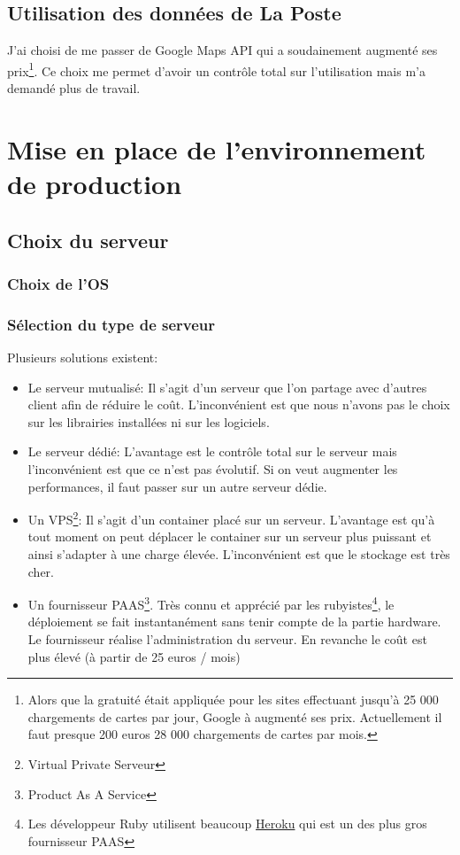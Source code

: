 \documentclass[]{report}
\begin{document}
  \section{Utilisation des données de La Poste}

    J'ai choisi  de me passer de Google Maps API qui a soudainement augmenté ses prix\footnote{Alors que la gratuité était appliquée pour les sites effectuant jusqu'à 25 000 chargements de cartes par jour, Google à augmenté ses prix. Actuellement il faut presque 200 euros 28 000 chargements de cartes par mois.}. Ce choix me permet d'avoir un contrôle total sur l'utilisation mais m'a demandé plus de travail.

\chapter{Mise en place de l’environnement de production}

  \section{Choix du serveur}

    \subsection{Choix de l'OS}

    \subsection{Sélection du type de serveur}

      Plusieurs solutions existent:

      \begin{itemize}
        \item Le serveur mutualisé: Il s’agit d’un serveur que l’on partage avec d’autres client afin de réduire le coût. L’inconvénient est que nous n’avons pas le choix sur les librairies installées ni sur les logiciels.
        \item Le serveur dédié: L’avantage est le contrôle total sur le serveur mais l’inconvénient est que ce n’est pas évolutif. Si on veut augmenter les performances, il faut passer sur un autre serveur dédie.
        \item Un VPS\footnote{Virtual Private Serveur}: Il s’agit d’un container placé sur un serveur. L’avantage est qu’à tout moment on peut déplacer le container sur un serveur plus puissant et ainsi s’adapter à une charge élevée. L’inconvénient est que le stockage est très cher.
        \item Un fournisseur PAAS\footnote{Product As A Service}. Très connu et apprécié par les rubyistes\footnote{Les développeur Ruby utilisent beaucoup  \href{https://www.heroku.com}{Heroku} qui est un des plus gros fournisseur PAAS}, le déploiement se fait instantanément sans tenir compte de la partie hardware.  Le fournisseur réalise l’administration du serveur. En revanche le coût est plus élevé (à partir de 25 euros / mois)
      \end{itemize}
\end{document}
